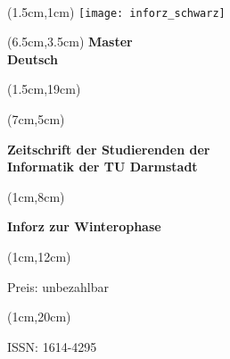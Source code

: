 \begin{titlepage}~


	\begin{textblock*}{12cm}(1.5cm,1cm)
		\texttt{[image: inforz\_schwarz]}
	\end{textblock*}


    \begin{textblock*}{12cm}(6.5cm,3.5cm)
        \centering\fontsize{25}{25}\sffamily\textbf{
            \textcolor{mycolor}{Master } \\
            \textcolor{mycolor}{Deutsch}}
    \end{textblock*}


	\begin{textblock*}{12cm}(1.5cm,19cm)
	\end{textblock*}

	\begin{textblock*}{7cm}(7cm,5cm)
		\begin{flushright}
			\large\sffamily\textbf{
				\textcolor{.}{Zeitschrift der Studierenden der}\\
				\textcolor{.}{Informatik der TU Darmstadt}}
		\end{flushright}
	\end{textblock*}



	\begin{textblock*}{5cm}(1cm,8cm)
		\begin{rotate}{90}
			\sffamily\huge\textbf{
				\textcolor{.}{Inforz zur Winterophase \the\year}}
		\end{rotate}
	\end{textblock*}


	\begin{textblock*}{2cm}(1cm,12cm)
		\begin{rotate}{90}
			\sffamily\tiny \textcolor{.}{Preis: unbezahlbar}
		\end{rotate}
	\end{textblock*}


	\begin{textblock*}{2cm}(1cm,20cm)
		\begin{rotate}{90}
			\sffamily \textcolor{.}{ISSN: 1614-4295}
		\end{rotate}
	\end{textblock*}
\end{titlepage}
\newpage


